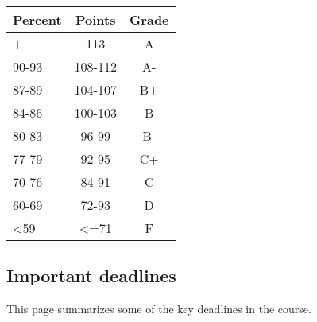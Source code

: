\documentclass[
  letterpaper,
  DIV=11,
  numbers=noendperiod]{scrartcl}
\begin{document}
\begin{longtable}[]{@{}lcc@{}}
\toprule\noalign{}
Percent & Points & Grade \\
\midrule\noalign{}
\endhead
\bottomrule\noalign{}
\endlastfoot
94+ & 113 & A \\
90-93 & 108-112 & A- \\
87-89 & 104-107 & B+ \\
84-86 & 100-103 & B \\
80-83 & 96-99 & B- \\
77-79 & 92-95 & C+ \\
70-76 & 84-91 & C \\
60-69 & 72-93 & D \\
\textless59 & \textless=71 & F \\
\end{longtable}

\subsection{Important deadlines}\label{important-deadlines}

This page summarizes some of the key deadlines in the course.
\end{document}
